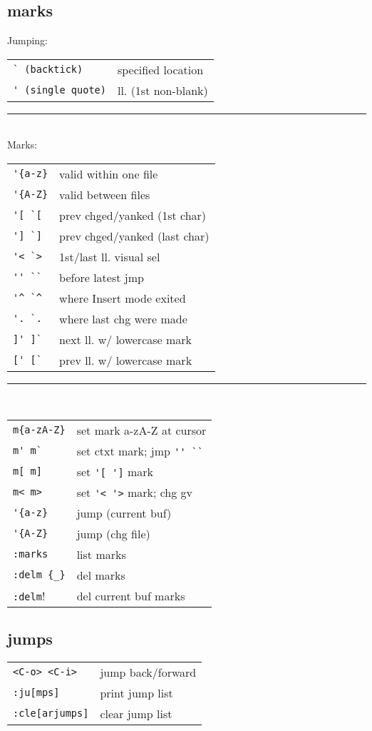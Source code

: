 \subsection{marks}
Jumping: \\
\begin{tabular}{@{}ll@{}}
    \verb!` (backtick)!         & specified location \\
    \verb!' (single quote)!     & ll. (1st non-blank) \\
\end{tabular}

\hrulefill \noindent\rule{4cm}{0.4pt} \\
Marks: \\
\begin{tabular}{@{}ll@{}}
    \verb!'{a-z}!       & valid within one file \\
    \verb!'{A-Z}!       & valid between files \\
    \verb!'[ `[!        & prev chged/yanked (1st char) \\
    \verb!'] `]!        & prev chged/yanked (last char) \\
    \verb!'< `>!        & 1st/last ll. visual sel \\
    \verb!'' ``!        & before latest jmp \\
    \verb!'^ `^!        & where Insert mode exited \\
    \verb!'. `.!        & where last chg were made \\

    \verb!]' ]`!        & next ll. w/ lowercase mark \\
    \verb![' [`!        & prev ll. w/ lowercase mark \\
\end{tabular}

\hrulefill \noindent\rule{4cm}{0.4pt} \\
\begin{tabular}{@{}ll@{}}
    \verb!m{a-zA-Z}!            & set mark {a-zA-Z} at cursor \\
    \verb!m' m`!                & set ctxt mark; jmp \verb!'' ``! \\
    \verb!m[ m]!                & set \verb!'[ ']! mark \\
    \verb!m< m>!                & set \verb!'< '>! mark; chg gv \\

    \verb!'{a-z}!               & jump (current buf) \\
    \verb!'{A-Z}!               & jump (chg file) \\

    \verb!:marks!               & list marks \\
    \verb!:delm {_}!            & del marks \\
    \verb!:delm!!               & del current buf marks \\
\end{tabular}


\subsection{jumps}
\begin{tabular}{@{}ll@{}}
    \verb!<C-o> <C-i>!      & jump back/forward \\
    \verb!:ju[mps]!         & print jump list \\
    \verb!:cle[arjumps]!    & clear jump list \\
\end{tabular}

